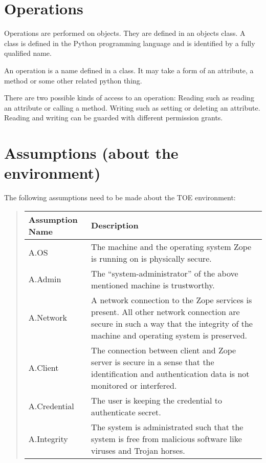 \documentclass[10pt,a4paper,english]{scrbook}
\begin{document}

\hypertarget{operations}{}
\section{Operations}

Operations are performed on objects. They are defined in an objects class. A
class is defined in the Python programming language and is identified by a
fully qualified name.

An operation is a name defined in a class. It may take a form of an attribute, a
method or some other related python thing.

There are two possible kinds of access to an operation: Reading such as
reading an attribute or calling a method. Writing such as setting or deleting
an attribute. Reading and writing can be guarded with different permission grants.



\hypertarget{assumptions-about-the-environment}{}
\section{Assumptions (about the environment)}

The following assumptions need to be made about the TOE environment:
\begin{quote}

\begin{longtable}[c]{|l|l|}
\hline
\textbf{
Assumption Name
} & \textbf{
Description
} \\
\hline
\endhead

A.OS
 & 
The machine and the operating system Zope is
running on is physically secure.
 \\
\hline

A.Admin
 & 
The ``system-administrator'' of the above
mentioned machine is trustworthy.
 \\
\hline

A.Network
 & 
A network connection to the Zope services is
present. All other network connection are
secure in such a way that the integrity of
the machine and operating system is preserved.
 \\
\hline

A.Client
 & 
The connection between client and Zope server is
secure in a sense that the identification and
authentication data is not monitored or interfered.
 \\
\hline

A.Credential
 & 
The user is keeping the credential to authenticate
secret.
 \\
\hline

A.Integrity
 & 
The system is administrated such that the system is
free from malicious software like viruses and
Trojan horses.
 \\
\hline
\end{longtable}
\end{quote}
\end{document}

